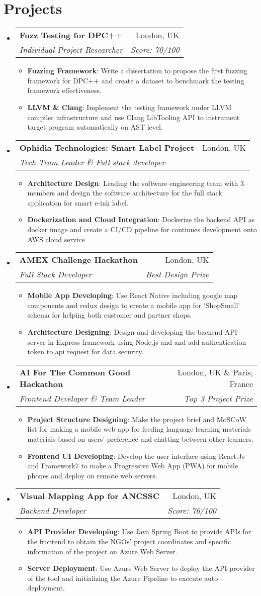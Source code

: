 \documentclass[letterpaper,11pt]{article}
\makeatletter
\newcommand{\resumeItem}[2]{
  \item\small{
    \textbf{#1}{: #2 \vspace{-2pt}}
  }
}
\newcommand{\resumeSubheading}[4]{
  \vspace{-1pt}\item
    \begin{tabular*}{0.97\textwidth}[t]{l@{\extracolsep{\fill}}r}
      \textbf{#1} & #2 \\
      \textit{\small#3} & \textit{\small #4} \\
    \end{tabular*}\vspace{-5pt}
}
\newcommand{\resumeSubHeadingListStart}{\begin{itemize}[leftmargin=*]}
\newcommand{\resumeSubHeadingListEnd}{\end{itemize}}
\newcommand{\resumeItemListStart}{\begin{itemize}}
\newcommand{\resumeItemListEnd}{\end{itemize}\vspace{-5pt}}
\makeatother
\begin{document}
\section{Projects}
  \resumeSubHeadingListStart
    \resumeSubheading
    {Fuzz Testing for DPC++}{London, UK}
    {Individual Project Researcher}{Score: 70/100}
    \resumeItemListStart
      \resumeItem{Fuzzing Framework}
          {Write a dissertation to propose the first fuzzing framework for DPC++ and create a dataset to benchmark the testing framework effectiveness.}
      \resumeItem{LLVM \& Clang}
          {Implement the testing framework under LLVM compiler infrastructure and use Clang LibTooling API to instrument target program automatically on AST level.}
    \resumeItemListEnd
    \resumeSubheading
    {Ophidia Technologies: Smart Label Project}{London, UK}
    {Tech Team Leader \& Full stack developer}{}
    \resumeItemListStart
      \resumeItem{Architecture Design}
          {Leading the software engineering team with 3 members and design the software architecture for the full stack application for smart e-ink label.}
      \resumeItem{Dockerization and Cloud Integration}
          {Dockerize the backend API as docker image and create a CI/CD pipeline for continues development onto AWS cloud service}
    \resumeItemListEnd
    \resumeSubheading
    {AMEX Challenge Hackathon}{London, UK}
    {Full Stack Developer}{Best Design Prize}
    \resumeItemListStart
      \resumeItem{Mobile App Developing}
          {Use React Native including google map components and redux design to create a mobile app 
          for `ShopSmall' schema for helping both customer and partner shops.}
      \resumeItem{Architecture Designing}
          {Design and developing the backend API server in Express framework using Node.js and and 
          add authentication token to api request for data security.}
    \resumeItemListEnd

    \resumeSubheading
    {AI For The Common Good Hackathon}{London, UK \& Paris, France}
    {Frontend Developer \& Team Leader}{Top 3 Project Prize}
    \resumeItemListStart
      \resumeItem{Project Structure Designing}
          {Make the project brief and MoSCoW list for making a mobile web app for feeding language learning materials
          materials based on users' preference and chatting between other learners.}
      \resumeItem{Frontend UI Developing}
          {Develop the user interface using React.Js and Framework7
          to make a Progressive Web App (PWA) for mobile phones and deploy on remote web servers.}
    \resumeItemListEnd

    \resumeSubheading
    {Visual Mapping App for ANCSSC}{London, UK}
    {Backend Developer}{Score: 76/100}
    \resumeItemListStart
      \resumeItem{API Provider Developing}
          {Use Java Spring Boot to provide APIs for the frontend to obtain the NGOs' project coordinates and 
          specific information of the project on Azure Web Server.}
      \resumeItem{Server Deployment}
          {Use Azure Web Server to deploy the API provider of the tool and initializing the Azure Pipeline to
           execute auto deployment.}
    \resumeItemListEnd
  \resumeSubHeadingListEnd

\end{document}
